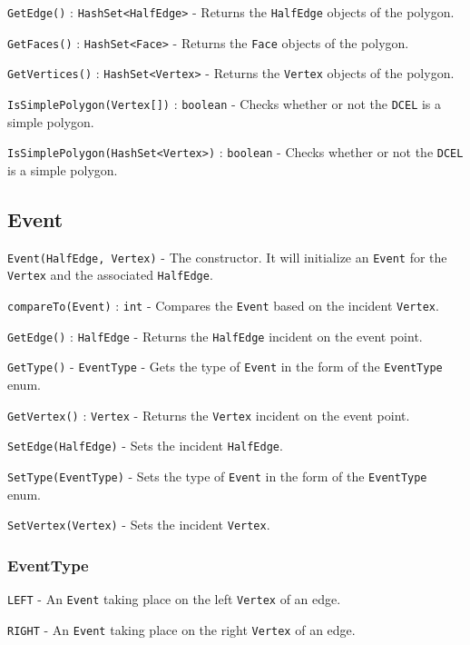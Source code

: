 \documentclass[11pt]{article}
\begin{document}
	\texttt{GetEdge()} : \texttt{HashSet<HalfEdge>} - Returns the \texttt{HalfEdge} objects of the polygon.
	
	\texttt{GetFaces()} : \texttt{HashSet<Face>} - Returns the \texttt{Face} objects of the polygon.
	
	\texttt{GetVertices()} : \texttt{HashSet<Vertex>} - Returns the \texttt{Vertex} objects of the polygon.
	
	\texttt{IsSimplePolygon(Vertex[])} : \texttt{boolean} - Checks whether or not the \texttt{DCEL} is a simple polygon.
	
	\texttt{IsSimplePolygon(HashSet<Vertex>)} : \texttt{boolean} - Checks whether or not the \texttt{DCEL} is a simple polygon.

\subsection{Event}
\label{sec:event}

	\texttt{Event(HalfEdge, Vertex)} - The constructor. It will initialize an \texttt{Event} for the \texttt{Vertex} and the associated \texttt{HalfEdge}.
	
	\texttt{compareTo(Event)} : \texttt{int} - Compares the \texttt{Event} based on the incident \texttt{Vertex}.
	
	\texttt{GetEdge()} : \texttt{HalfEdge} - Returns the \texttt{HalfEdge} incident on the event point.
	
	\texttt{GetType()} - \texttt{EventType} - Gets the type of \texttt{Event} in the form of the \texttt{EventType} enum.
	
	\texttt{GetVertex()} : \texttt{Vertex} - Returns the \texttt{Vertex} incident on the event point.
	
	\texttt{SetEdge(HalfEdge)} - Sets the incident \texttt{HalfEdge}.
	
	\texttt{SetType(EventType)} - Sets the type of \texttt{Event} in the form of the \texttt{EventType} enum.
	
	\texttt{SetVertex(Vertex)} - Sets the incident \texttt{Vertex}.
	
\subsubsection{EventType}
\label{sec:eventtype}

	\texttt{LEFT} - An \texttt{Event} taking place on the left \texttt{Vertex} of an edge.
	
	\texttt{RIGHT} - An \texttt{Event} taking place on the right \texttt{Vertex} of an edge.
\end{document}
